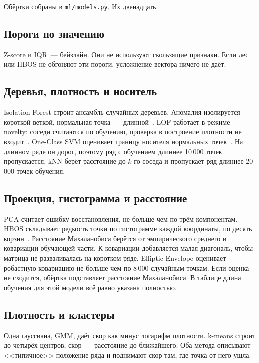 Обёртки собраны в \texttt{ml/models.py}.
Их двенадцать.

\subsection{Пороги по значению}

Z-score и IQR~--- бейзлайн.
Они не используют скользящие признаки.
Если лес или HBOS не обгоняют эти пороги, усложнение вектора ничего не даёт.

\subsection{Деревья, плотность и носитель}

Isolation Forest строит ансамбль случайных деревьев.
Аномалия изолируется короткой веткой, нормальная точка~--- длинной~\cite{liu2008isolation}.
LOF работает в режиме novelty: соседи считаются по обучению, проверка в построение плотности не входит~\cite{breunig2000lof}.
One-Class SVM оценивает границу носителя нормальных точек~\cite{scholkopf2001ocsvm}.
На длинном ряде он дорог, поэтому ряд с обучением длиннее 10\,000 точек пропускается.
kNN берёт расстояние до \(k\)-го соседа и пропускает ряд длиннее 20\,000 точек обучения.

\subsection{Проекция, гистограмма и расстояние}

PCA считает ошибку восстановления, не больше чем по трём компонентам.
HBOS складывает редкость точки по гистограмме каждой координаты, по десять корзин~\cite{goldstein2012hbos}.
Расстояние Махаланобиса берётся от эмпирического среднего и ковариации обучающей части.
К ковариации добавляется малая диагональ, чтобы матрица не разваливалась на коротком ряде.
Elliptic Envelope оценивает робастную ковариацию не больше чем по 8\,000 случайным точкам.
Если оценка не сходится, обёртка подставляет расстояние Махаланобиса.
В таблице длина обучения для этой модели всё равно указана полностью.

\subsection{Плотность и кластеры}

Одна гауссиана, GMM, даёт скор как минус логарифм плотности.
k-means строит до четырёх центров, скор~--- расстояние до ближайшего.
Оба метода описывают <<типичное>> положение ряда и поднимают скор там, где точка от него ушла.

